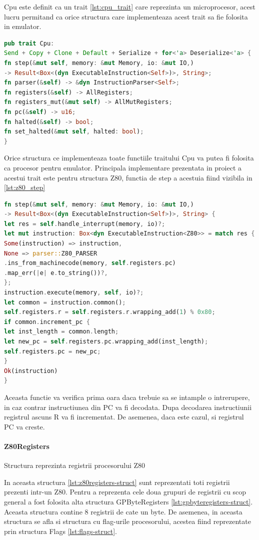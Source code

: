 \documentclass[titlepage,12pt]{article}
\DeclareRobustCommand{\code}[1]{{\ttfamily\small #1}}
\begin{document}
\code{Cpu} este definit ca un trait \cref{lst:cpu_trait} care reprezinta un microprocesor, acest lucru permitand ca orice structura care implementeaza acest trait sa fie folosita in emulator.
\begin{lstlisting}[language=Rust,caption={Trait CPU},label={lst:cpu_trait}]
pub trait Cpu:
Send + Copy + Clone + Default + Serialize + for<'a> Deserialize<'a> {
fn step(&mut self, memory: &mut Memory, io: &mut IO,)
-> Result<Box<(dyn ExecutableInstruction<Self>)>, String>;
fn parser(&self) -> &dyn InstructionParser<Self>;
fn registers(&self) -> AllRegisters;
fn registers_mut(&mut self) -> AllMutRegisters;
fn pc(&self) -> u16;
fn halted(&self) -> bool;
fn set_halted(&mut self, halted: bool);
}
\end{lstlisting}
Orice structura ce implementeaza toate functiile traitului \code{Cpu} va putea fi folosita ca procesor pentru emulator. Principala implementare prezentata in proiect a acestui trait este pentru structura \code{Z80}, functia de step a acestuia fiind vizibila in \cref{lst:z80_step}
\begin{lstlisting}[language=Rust,caption={Functia step Z80},label={lst:z80_step}]
fn step(&mut self, memory: &mut Memory, io: &mut IO,)
-> Result<Box<(dyn ExecutableInstruction<Self>)>, String> {
let res = self.handle_interrupt(memory, io)?;
let mut instruction: Box<dyn ExecutableInstruction<Z80>> = match res {
Some(instruction) => instruction,
None => parser::Z80_PARSER
.ins_from_machinecode(memory, self.registers.pc)
.map_err(|e| e.to_string())?,
};
instruction.execute(memory, self, io)?;
let common = instruction.common();
self.registers.r = self.registers.r.wrapping_add(1) % 0x80;
if common.increment_pc {
let inst_length = common.length;
let new_pc = self.registers.pc.wrapping_add(inst_length);
self.registers.pc = new_pc;
}
Ok(instruction)
}
\end{lstlisting}

Aceasta functie va verifica prima oara daca trebuie sa se intample o intrerupere, in caz contrar instructiunea din PC va fi decodata. Dupa decodarea instructiunii registrul ascuns R va fi incrementat. De asemenea, daca este cazul, si registrul PC va creste.

\paragraph{\code{Z80Registers}} Structura reprezinta registrii procesorului Z80

In aceasta structura \cref{lst:z80registers-struct} sunt reprezentati toti registrii prezenti intr-un Z80. Pentru a reprezenta cele doua grupuri de registrii cu scop general a fost folosita alta structura \code{GPByteRegisters} \cref{lst:gpbyteregisters-struct}. Aceasta structura contine 8 registrii de cate un byte. De asemenea, in aceasta structura se afla si structura cu flag-urile procesorului, acestea fiind reprezentate prin structura \code{Flags} \cref{lst:flags-struct}.
\end{document}
